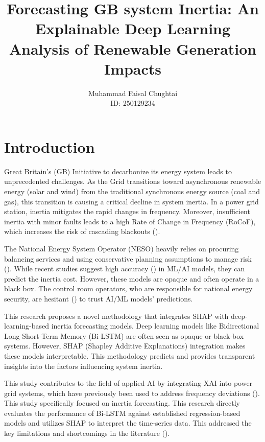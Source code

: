 \documentclass[12pt,a4paper,onecolumn]{article}
\title{Forecasting GB system Inertia: An Explainable Deep Learning Analysis of Renewable Generation Impacts}
\author{Muhammad Faisal Chughtai\\
ID: 250129234}
\date{}
\begin{document}
\maketitle



\section{Introduction}
\label{sec:intro}
Great Britain's (GB) Initiative to decarbonize its energy system leads to unprecedented challenges. As the Grid transitions toward asynchronous renewable energy (solar and wind) from the traditional synchronous energy source (coal and gas), this transition is causing a critical decline in system inertia. In a power grid station, inertia mitigates the rapid changes in frequency. Moreover, insufficient inertia with minor faults leads to a high Rate of Change in Frequency (RoCoF), which increases the risk of cascading blackouts (\cite{he2024analysis}).

The National Energy System Operator (NESO) heavily relies on procuring balancing services and using conservative planning assumptions to manage risk (\cite{NESO2025Inertia}). While recent studies suggest high accuracy (\cite{dey2025system}) in ML/AI models, they can predict the inertia cost. However, these models are opaque and often operate in a black box. The control room operators, who are responsible for national energy security, are hesitant ({\cite{machlev2022explainable}}) to trust AI/ML models' predictions.

This research proposes a novel methodology that integrates SHAP with deep-learning-based inertia forecasting models. Deep learning models like Bidirectional Long Short-Term Memory (Bi-LSTM) are often seen as opaque or black-box systems. However, SHAP (Shapley Additive Explanations) integration makes these models interpretable. This methodology predicts and provides transparent insights into the factors influencing system inertia.

This study contributes to the field of applied AI by integrating XAI into power grid systems, which have previously been used to address frequency deviations ({\cite{kruse2021revealing}}). This study specifically focused on inertia forecasting. This research directly evaluates the performance of Bi-LSTM against established regression-based models and utilizes SHAP to interpret the time-series data. This addressed the key limitations and shortcomings in the literature (\cite{santosh2024inertia}).
\end{document}
